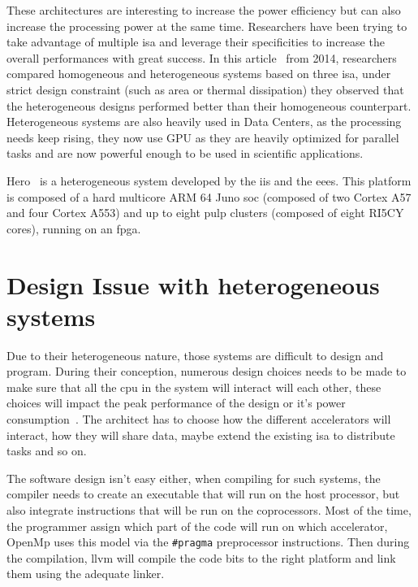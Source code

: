 	These architectures are interesting to increase the power efficiency but can also increase the processing power at the same time. Researchers have been trying to take advantage of multiple \gls{isa} and leverage their specificities to increase the overall performances with great success. In this article~\cite{Art:Harnessing} from 2014, researchers compared homogeneous and heterogeneous systems based on three \gls{isa}, under strict design constraint (such as area or thermal dissipation) they observed that the heterogeneous designs performed better than their homogeneous counterpart. Heterogeneous systems are also heavily used in Data Centers, as the processing needs keep rising, they now use GPU as they are heavily optimized for parallel tasks and are now powerful enough to be used in scientific applications.

    Hero~\cite{Art:Hero} is a heterogeneous system developed by the \gls{iis} and the \gls{eees}. This platform is composed of a hard multicore ARM 64 Juno \gls{soc} (composed of two Cortex A57 and four Cortex A553) and up to eight \gls{pulp} clusters (composed of eight RI5CY cores), running on an \gls{fpga}.

\section {Design Issue with heterogeneous systems}
	Due to their heterogeneous nature, those systems are difficult to design and program. During their conception, numerous design choices needs to be made to make sure that all the \gls{cpu} in the system will interact will each other, these choices will impact the peak performance of the design or it's power consumption~\cite{Art:Harnessing}. The architect has to choose how  the different accelerators will interact, how they will share data, maybe extend the existing \gls{isa} to distribute tasks and so on.

	The software design isn't easy either, when compiling for such systems, the compiler needs to create an executable that will run on the host processor, but also integrate instructions that will be run on the coprocessors. Most of the time, the programmer assign which part of the code will run on which accelerator, OpenMp uses this model via the \verb|#pragma| preprocessor instructions. Then during the compilation, llvm will compile the code bits to the right platform and link them using the adequate linker.



